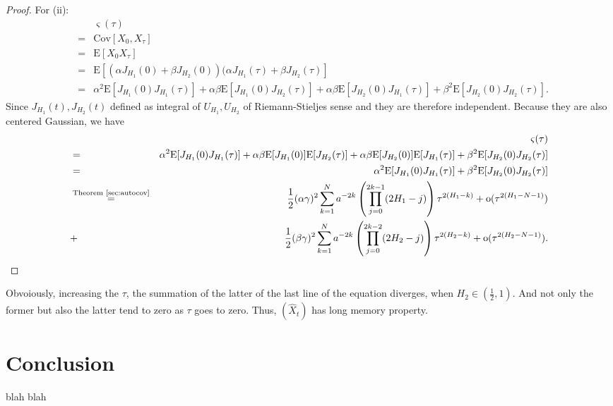 \documentclass[a4paper, twoside, 11pt]{article}
\theoremstyle{definition}
\newcommand{\brkt}[1]{\left({#1} \right)}
\begin{document}
\begin{proof}
  For (ii): 
  \begin{eqnarray*}
	&&\varsigma(\tau) \\
	&=& \mathrm{Cov}[X_0,X_\tau]\\
	&=& \mathrm{E}[X_0X_\tau]\\
	&=& \mathrm{E}[(\alpha J_{H_1}(0) + \beta J_{H_2}(0))(\alpha J_{H_1}(\tau) + \beta J_{H_2}(\tau)]\\
	&=& \alpha^2\mathrm{E}[J_{H_1}(0) J_{H_1}(\tau)] + \alpha\beta\mathrm{E}[J_{H_1}(0)J_{H_2}(\tau)] + \alpha\beta\mathrm{E}[J_{H_2}(0)J_{H_1}(\tau)] + \beta^2\mathrm{E}[J_{H_2}(0)J_{H_2}(\tau)].
  \end{eqnarray*}
  Since $J_{H_1}(t), J_{H_2}(t)$ defined as integral of $U_{H_1}, U_{H_2}$ of Riemann-Stieljes sense and they are therefore independent. Because they are also centered Gaussian, we have
  \begin{eqnarray*}
	&&\varsigma(\tau) \\
	&=& \alpha^2\mathrm{E}[J_{H_1}(0) J_{H_1}(\tau)] + \alpha\beta\mathrm{E}[J_{H_1}(0)]\mathrm{E}[J_{H_2}(\tau)] + \alpha\beta\mathrm{E}[J_{H_2}(0)]\mathrm{E}[J_{H_1}(\tau)] + \beta^2\mathrm{E}[J_{H_2}(0)J_{H_2}(\tau)]\\
	&=& \alpha^2\mathrm{E}[J_{H_1}(0) J_{H_1}(\tau)] + \beta^2\mathrm{E}[J_{H_2}(0)J_{H_2}(\tau)]\\
  &\overset{\text{Theorem \ref{sec:autocov}}}{=}& \frac{1}{2} (\alpha\gamma)^2 \sum_{k=1}^{N} a^{-2k}\brkt{\prod_{j=0}^{2k-1}(2H_1-j)}\tau^{2(H_1-k)} + \mathrm{o}(\tau^{2(H_1-N-1)})\\
  &+& \frac{1}{2} (\beta\gamma)^2 \sum_{k=1}^{N} a^{-2k}\brkt{\prod_{j=0}^{2k-2}(2H_2-j)}\tau^{2(H_2-k)} + \mathrm{o}(\tau^{2(H_2-N-1)}).
  \end{eqnarray*}
  \end{proof}
  Obvoiously, increasing the $\tau$, the summation of the latter of the last line of the equation diverges, when $H_2 \in (\frac{1}{2}, 1)$. And not only the former but also the latter tend to zero as $\tau$ goes to zero. Thus, $(\hat{X}_t)$ has long memory property.




\newpage



\section{Conclusion}

blah
\newpage
blah
\newpage
\end{document}
